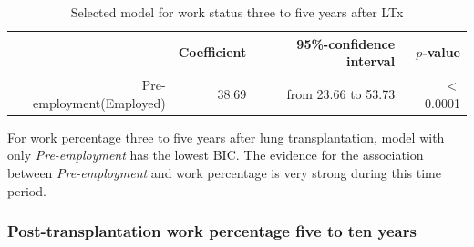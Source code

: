 \documentclass[11pt, a4paper]{article}\usepackage[]{graphicx}\usepackage[]{color}
\begin{document}
{%
\begin{table}[!h]
\centering
\caption{Selected model for work status three to five years after LTx} 
\begingroup\footnotesize
\begin{tabular}{rrrr}
  \hline
 & Coefficient & 95\%-confidence interval & $p$-value \\ 
  \hline
Pre-employment(Employed) & 38.69 & from 23.66 to 53.73 & $<$ 0.0001 \\ 
   \hline
\end{tabular}
\endgroup
\end{table}


For work percentage three to five years after lung transplantation, model with only \textit{Pre-employment} has the lowest BIC. The evidence for the association between \textit{Pre-employment} and work percentage is very strong during this time period. 

\clearpage
\subsubsection*{Post-transplantation work percentage five to ten years} \label{subsubsection:linear4}

\begin{table}[ht]
\centering
\caption{Univariate models for work percentage 
                  five to ten years after LTx} 
\end{table}



}
\end{document}
